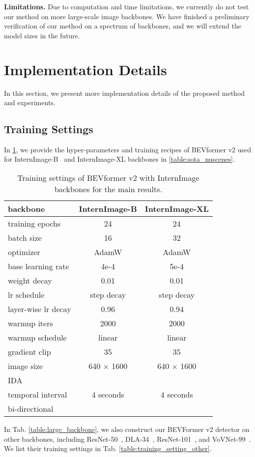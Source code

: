 \documentclass[10pt,twocolumn,letterpaper]{article}
\begin{document}
\noindent\textbf{Limitations.} Due to computation and time limitations, we currently do not test our method on more large-scale image backbones. We have finished a preliminary verification of our method on a spectrum of backbones, and we will extend the model sizes in the future. 
{\small


}

\appendix
\clearpage
\section{Implementation Details}
In this section, we present more implementation details of the proposed method and experiments.

\subsection{Training Settings}
 In \cref{table:training_setting_main}, we provide the hyper-parameters and training recipes of BEVformer v2 used for InternImage-B~\cite{InternImage} and InternImage-XL backbones in \cref{table:sota_nuscenes}.

\let\ck\checkmark

\setlength{\tabcolsep}{5pt}
\setlength{\doublerulesep}{2\arrayrulewidth}
\renewcommand{\arraystretch}{1.0}
\begin{table}[ht]
    \caption{Training settings of BEVformer v2 with InternImage backbones for the main results.}
    \label{table:training_setting_main}
    \centering
    \begin{tabular}{l|cc}
backbone & InternImage-B & InternImage-XL \\
        \hline
        training epochs & 24 & 24 \\
        batch size & 16 & 32 \\
        optimizer & AdamW & AdamW \\
        base learning rate & 4e-4 & 5e-4 \\
        weight decay & 0.01 & 0.01 \\
        lr schedule & step decay & step decay\\
        layer-wise lr decay & 0.96 & 0.94 \\
        warmup iters & 2000 & 2000  \\
        warmup schedule & linear & linear \\
        gradient clip & 35 & 35 \\
        \hline
        image size & 640 $\times$ 1600 & 640 $\times$ 1600 \\
        IDA & \ck & \ck \\
        temporal interval & 4 seconds & 4 seconds \\
        bi-directional & \ck & \ck \\
        \hline
    \end{tabular}
    
\end{table} 
In Tab. \ref{table:large_backbone}, we also construct our BEVFormer v2 detector on other backbones, including ResNet-50~\cite{ResNet}, DLA-34~\cite{DLA}, ResNet-101~\cite{ResNet}, and VoVNet-99~\cite{Vovnet}. We list their training settings in Tab. \ref{table:training_setting_other}.
\end{document}
